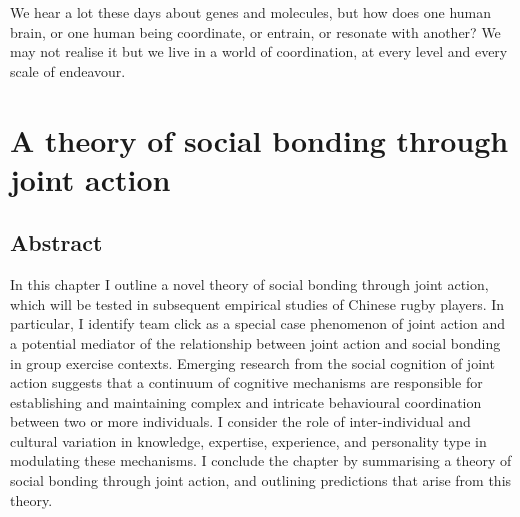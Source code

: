 
\begin{savequote}[8cm]

    We hear a lot these days about genes and molecules, but how does one human brain, or one human being coordinate, or entrain, or resonate with another?  We may not realise it but we live in a world of coordination, at every level and every scale of endeavour.

\end{savequote}




\chapter{\label{theoryContribution}A theory of social bonding through joint action}


\minitoc

\section{Abstract}

In this chapter I outline a novel theory of social bonding through joint action, which will be tested in subsequent empirical studies of Chinese rugby players.  In particular, I identify team click as a special case phenomenon of joint action and a potential mediator of the relationship between joint action and social bonding in group exercise contexts.  Emerging research from the social cognition of joint action suggests that a continuum of cognitive mechanisms are responsible for establishing and maintaining complex and intricate behavioural coordination between two or more individuals.  I consider the role of inter-individual and cultural variation in knowledge, expertise, experience, and personality type in modulating these mechanisms. I conclude the chapter by summarising a theory of social bonding through joint action, and outlining predictions that arise from this theory.







